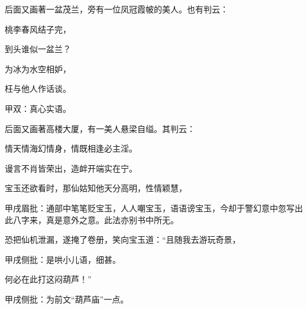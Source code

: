 \begin{parag}
    后面又画著一盆茂兰，旁有一位凤冠霞帔的美人。也有判云：
\end{parag}


\begin{poem}
    \begin{pl}桃李春风结子完，\end{pl}

    \begin{pl}到头谁似一盆兰？\end{pl}

    \begin{pl}为冰为水空相妒，\end{pl}

    \begin{pl}枉与他人作话谈。\end{pl}\begin{note}甲双：真心实语。\end{note}

\end{poem}

\begin{parag}
    后面又画著高楼大厦，有一美人悬梁自缢。其判云：
\end{parag}
\begin{poem}
    \begin{pl}情天情海幻情身，情既相逢必主淫。\end{pl}

    \begin{pl}谩言不肖皆荣出，造衅开端实在宁。\end{pl}
\end{poem}

\begin{parag}
    宝玉还欲看时，那仙姑知他天分高明，性情颖慧，\begin{note}甲戌眉批：通部中笔笔贬宝玉，人人嘲宝玉，语语谤宝玉，今却于警幻意中忽写出此八字来，真是意外之意。此法亦别书中所无。\end{note}恐把仙机泄漏，遂掩了卷册，笑向宝玉道：“且随我去游玩奇景，\begin{note}甲戌侧批：是哄小儿语，细甚。\end{note}何必在此打这闷葫芦！”\begin{note}甲戌侧批：为前文“葫芦庙”一点。\end{note}
\end{parag}


